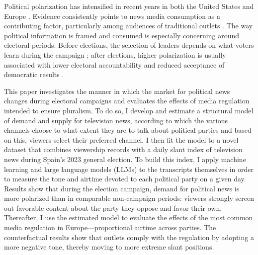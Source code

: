 \documentclass[12pt]{article}
\begin{document}
	Political polarization has intensified in recent years  in both  the United States and Europe \citep{Reiljan2019FearAL}. Evidence consistently points to news media consumption as a contributing factor, particularly among audiences of traditional outlets \citep[][]{martin2017,Boxell2020CrossCountryTI}. The way political information is framed and consumed is especially concerning around electoral periods. Before elections,  the selection of leaders depends on what voters learn during the campaign \citep{Besley2005}; after elections, higher polarization is usually associated with lower electoral accountability and reduced acceptance of democratic results \citep{Graham2019DemocracyIA}.
	
	
	
	This paper investigates the manner in which the market for political news changes during electoral campaigns and evaluates the effects of media regulation intended to ensure pluralism. To do so, I develop and estimate a structural model of demand and supply for television news, according to which the various channels choose to what extent they are to talk about political parties and based on this, viewers select their preferred channel. I then fit the model to a novel dataset that combines viewership records with a daily slant index of television news during Spain's 2023 general election. To build this index, I apply machine learning and large language models (LLMs) to the transcripts themselves in order to measure the tone and airtime devoted to each political party on a given day.  Results show that during the election campaign, demand for political news is more polarized than in comparable non-campaign periods: viewers strongly screen out favorable content about the party they oppose and favor their own. Thereafter, I use the estimated model to evaluate the effects of the most common media regulation in Europe—proportional airtime across parties. The counterfactual results show that outlets comply with the regulation by adopting a more negative tone, thereby moving to more extreme slant positions. 
	
\end{document}
